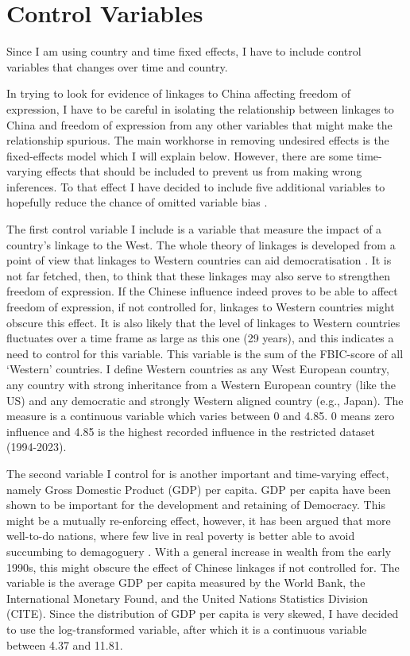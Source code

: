 \section{Control Variables} \label{control}

Since I am using country and time fixed effects, I have to include control variables that changes over time and country. 

In trying to look for evidence of linkages to China affecting freedom of expression, I have to be careful in isolating the relationship between linkages to China and freedom of expression from any other variables that might make the relationship spurious. The main workhorse in removing undesired effects is the fixed-effects model which I will explain below. However, there are some time-varying effects that should be included to prevent us from making wrong inferences. To that effect I have decided to include five additional variables to hopefully reduce the chance of omitted variable bias \citep[pp. 81-85]{wooldridge_econometric_2010}.

The first control variable I include is a variable that measure the impact of a country's linkage to the West. The whole theory of linkages is developed from a point of view that linkages to Western countries can aid democratisation \citep{levitsky_linkage_2006}. It is not far fetched, then, to think that these linkages may also serve to strengthen freedom of expression. If the Chinese influence indeed proves to be able to affect freedom of expression, if not controlled for, linkages to Western countries might obscure this effect. It is also likely that the level of linkages to Western countries fluctuates over a time frame as large as this one (29 years), and this indicates a need to control for this variable. This variable is the sum of the FBIC-score of all `Western' countries. I define Western countries as any West European country, any country with strong inheritance from a Western European country (like the US) and any democratic and strongly Western aligned country (e.g., Japan). The measure is a continuous variable which varies between 0 and 4.85. 0 means zero influence and 4.85 is the highest recorded influence in the restricted dataset (1994-2023). 

The second variable I control for is another important and time-varying effect, namely Gross Domestic Product (GDP) per capita. GDP per capita have been shown to be important for the development and retaining of Democracy. This might be a mutually re-enforcing effect, however, it has been argued that more well-to-do nations, where few live in real poverty is better able to avoid succumbing to demagoguery \citep[p. 75]{lipset_social_1959}. With a general increase in wealth from the early 1990s, this might obscure the effect of Chinese linkages if not controlled for. The variable is the average GDP per capita measured by the World Bank, the International Monetary Found, and the United Nations Statistics Division (CITE). Since the distribution of GDP per capita is very skewed, I have decided to use the log-transformed variable, after which it is a continuous variable between 4.37 and 11.81. 

